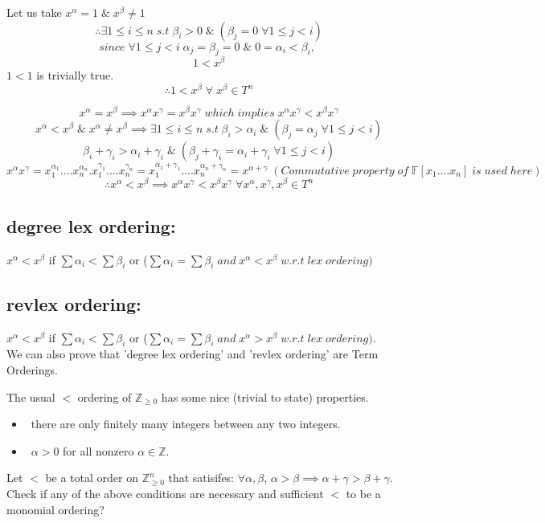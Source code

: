 Let us take $x^{\alpha}=1\;\&\;x^{\beta}\neq1$
$$\therefore\exists 1\leq i\leq n\;s.t\;\beta_{i}>0 \;\&\;(\beta_{j}=0 \;\forall 1\leq j<i)$$
$$since\;\forall 1\leq j<i \;\alpha_{j}=\beta_{j}=0\;\&\;0=\alpha_{i}<\beta_{i},\;$$
$$1<x^{\beta}$$
$1<1$ is trivially true.
$$\therefore1<x^{\beta}\;\forall\;x^{\beta}\in T^{n}$$

$$x^{\alpha}=x^{\beta} \implies x^{\alpha}x^{\gamma}=x^{\beta}x^{\gamma}\;which\;implies\;x^{\alpha}x^{\gamma}<x^{\beta}x^{\gamma}$$
$$x^{\alpha}<x^{\beta} \;\&\;x^{\alpha}\neq x^{\beta}\implies \exists 1\leq i\leq n\;s.t\;\beta_{i}>\alpha_{i} \;\&\;(\beta_{j}=\alpha_{j} \;\forall 1\leq j<i)$$ 
$$\beta_{i}+\gamma_{i}>\alpha_{i}+\gamma_{i} \;\&\;(\beta_{j}+\gamma_{i}=\alpha_{i}+\gamma_{i} \;\forall 1\leq j<i)$$
$$x^{\alpha}x^{\gamma}=x_{1}^{\alpha_{1}}....x_{n}^{\alpha_{n}}.x_{1}^{\gamma_{1}}....x_{n}^{\gamma_{n}}=x_{1}^{\alpha_{1}+\gamma_{1}}....x_{n}^{\alpha_{n}+\gamma_{n}}=x^{\alpha+\gamma}\;(Commutative \;property \;of \;\mathbb{F}[x_{1}....x_{n}] \;is \;used \;here) $$
$$\therefore x^{\alpha}<x^{\beta}\implies x^{\alpha}x^{\gamma}<x^{\beta}x^{\gamma}\; \forall x^{\alpha},x^{\gamma},x^{\beta}\in T^{n}$$
\subsection*{degree lex ordering:}
$x^{\alpha}<x^{\beta}$ if $\sum\alpha_{i}<\sum\beta_{i}$ or ($\sum\alpha_{i}=\sum\beta_{i}\; and\; x^{\alpha}<x^{\beta}\; w.r.t \;lex\; ordering)$
\subsection*{revlex ordering:}
$x^{\alpha}<x^{\beta}$ if $\sum\alpha_{i}<\sum\beta_{i}$ or ($\sum\alpha_{i}=\sum\beta_{i}\; and\; x^{\alpha}>x^{\beta}\; w.r.t\; lex \;ordering)$.
$$$$
We can also prove that 'degree lex ordering' and 'revlex ordering' are Term Orderings.
\begin{exercise}
The usual $<$ ordering of $\mathbb{Z}_{\ge 0}$ has some nice (trivial to state) properties.
\begin{itemize}
\item ~there are only finitely many integers between any two integers. 
\item ~$\alpha > 0$ for all nonzero $\alpha \in \mathbb{Z}$. 
\end{itemize}
Let $<$ be a total order on $\mathbb{Z}_{\ge 0}^n$ that satisifes: $\forall \alpha, \beta$,  $\alpha > \beta \implies \alpha+\gamma > \beta+\gamma$.
Check if any of the above conditions are necessary and sufficient $<$  to be a monomial ordering?
\end{exercise}

